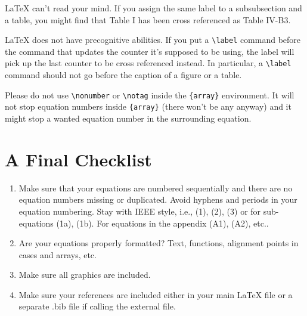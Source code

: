 \documentclass[lettersize,journal]{IEEEtran}
\begin{document}
{\LaTeX} can't read your mind. If you assign the same label to a
subsubsection and a table, you might find that Table I has been cross
referenced as Table IV-B3.

{\LaTeX} does not have precognitive abilities. If you put a
\verb|\label| command before the command that updates the counter it's
supposed to be using, the label will pick up the last counter to be
cross referenced instead. In particular, a \verb|\label| command
should not go before the caption of a figure or a table.

Please do not use \verb|\nonumber| or \verb|\notag| inside the
\verb|{array}| environment. It will not stop equation numbers inside
\verb|{array}| (there won't be any anyway) and it might stop a wanted
equation number in the surrounding equation.

\balance

\section{A Final Checklist}
\begin{enumerate}{}{}
\item{Make sure that your equations are numbered sequentially and there are no equation numbers missing or duplicated. Avoid hyphens and periods in your equation numbering. Stay with IEEE style, i.e., (1), (2), (3) or for sub-equations (1a), (1b). For equations in the appendix (A1), (A2), etc.}.
\item{Are your equations properly formatted? Text, functions, alignment points in cases and arrays, etc. }
\item{Make sure all graphics are included.}
\item{Make sure your references are included either in your main LaTeX file or a separate .bib file if calling the external file.}
\end{enumerate}
\end{document}
